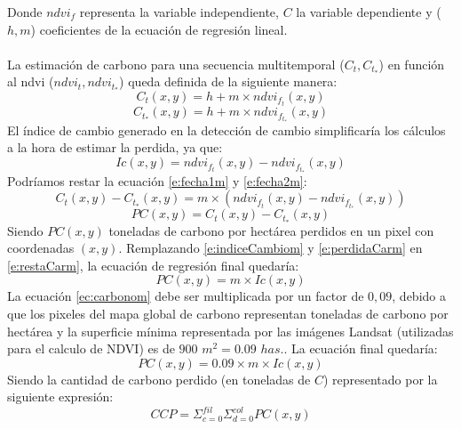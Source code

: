 Donde $ ndvi_{f} $ representa la variable independiente, $ C $ la variable dependiente y ($ h , m $) coeficientes de la ecuaci\'on de regresi\'on lineal. \\~\\
La estimaci\'on de carbono para una secuencia multitemporal ($ C_{t},C_{t_{*}} $) en funci\'on al ndvi ($ ndvi_{t},ndvi_{t_{*}} $) queda definida de la siguiente manera:
\begin{equation}
\label{e:fecha1m}
C_{t}(x,y)=h+m \times ndvi_{f_{t}}(x,y)
\end{equation}
\begin{equation}
\label{e:fecha2m}
C_{t_{*}}(x,y)=h+m \times ndvi_{f_{t_{*}}}(x,y)
\end{equation}
 El \'indice de cambio generado en la detecci\'on de cambio simplificar\'ia los c\'alculos a la hora de estimar la perdida, ya que:
 \begin{equation}
 \label{e:indiceCambiom}
 Ic(x,y)=ndvi_{f_{t}}(x,y) - ndvi_{f_{t_{*}}}(x,y)
 \end{equation}		
 Podr\'iamos restar la ecuaci\'on \ref{e:fecha1m} y \ref{e:fecha2m}:
 \begin{equation}
 \label{e:restaCarm}
C_{t}(x,y) - C_{t_{*}}(x,y)= m \times (ndvi_{f_{t}}(x,y) - ndvi_{f_{t_{*}}}(x,y))
 \end{equation}		
 \begin{equation}
 \label{e:perdidaCarm}
 PC(x,y)= C_{t}(x,y) - C_{t_{*}}(x,y)
 \end{equation}		
 Siendo $ PC(x,y)$ toneladas de carbono por hect\'area perdidos en un pixel con coordenadas $ (x,y) $. Remplazando \ref{e:indiceCambiom} y \ref{e:perdidaCarm} en \ref{e:restaCarm}, la ecuaci\'on de regresi\'on final quedar\'ia:
 \begin{equation}\label{ec:carbonom}
 PC(x,y) = m \times Ic(x,y)
 \end{equation}
 La ecuaci\'on \ref{ec:carbonom} debe ser multiplicada por un factor de $ 0,09 $, debido a que los pixeles del mapa global de carbono representan toneladas de carbono por hect\'area \cite{saatchi2011benchmark} y la superficie m\'inima representada por las im\'agenes Landsat (utilizadas para el calculo de NDVI) es de $ 900$  $m^{2}=0.09 $  $has. $. La ecuaci\'on final quedar\'ia:
 \begin{equation}\label{ec:carbonoFinalm}
 PC(x,y) = 0.09 \times m \times Ic(x,y)
 \end{equation}
 Siendo la cantidad de carbono perdido (en toneladas de $ C $) representado por la siguiente expresi\'on:
 \begin{equation}\label{ec:carbonoFinalsumatoriam}
 CCP = \Sigma_{c=0}^{fil}\Sigma_{d=0}^{col} PC(x,y)
 \end{equation}
  

